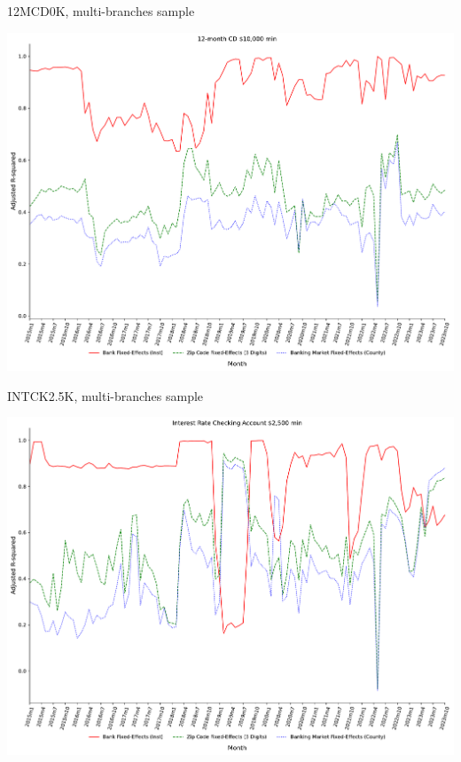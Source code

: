 \documentclass{beamer}
\begin{document}
\begin{frame}{12MCD0K, multi-branches sample}
\begin{center}
\includegraphics[width=1\textwidth]{figure/multi_branch_sample_932466/3_fixed_effects_same_as_GP_wp/12MCD10K_adjusted_R2_Rate_3_fixed_effects.pdf} 
\end{center}
\end{frame}


\begin{frame}{INTCK2.5K, multi-branches sample}
\begin{center}
\includegraphics[width=1\textwidth]{figure/multi_branch_sample_932466/3_fixed_effects_same_as_GP_wp/INTCK2_5K_adjusted_R2_Rate_3_fixed_effects.pdf} 
\end{center}
\end{frame}
\end{document}
